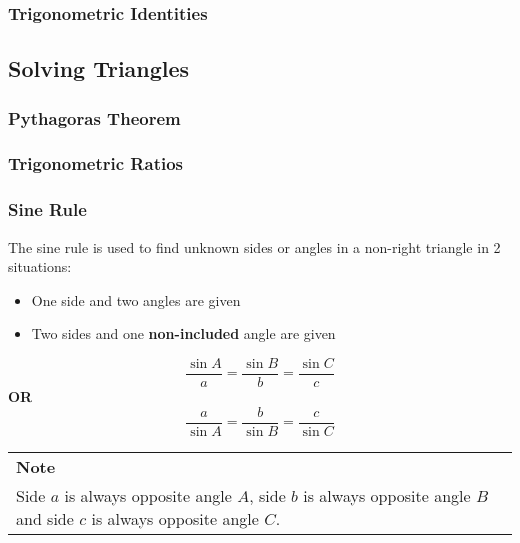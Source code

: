 \documentclass[a4paper]{article}
\newenvironment{Note}{
	\bgroup
	\def\arraystretch{1.5}
	\begin{NiceTabularX}{\textwidth}{X}
		\CodeBefore
		\columncolor{red!15}{1}
		\Body
		\textbf{Note} \\
}{
	\end{NiceTabularX}
	\egroup\mbox{}\\
}{}
\begin{document}
			\subsubsection{Trigonometric Identities}
		\subsection{Solving Triangles}
			\subsubsection{Pythagoras Theorem}
			\subsubsection{Trigonometric Ratios}
			\subsubsection{Sine Rule}
				The sine rule is used to find unknown sides or angles in a non-right triangle in 2 situations:
				\begin{itemize}
					\item One side and two angles are given
					\item Two sides and one \textbf{non-included} angle are given
				\end{itemize}
				\begin{minipage}{0.5\textwidth}
				\end{minipage}
				\hfill
				\begin{minipage}{0.5\textwidth}
					\centering
						\[
						\frac{\sin A}{a}=\frac{\sin B}{b}=\frac{\sin C}{c}
						\]
						\textbf{OR}
						\[
						\frac{a}{\sin A}=\frac{b}{\sin B}=\frac{c}{\sin C}
						\]
				\end{minipage}
				\begin{Note}
					Side $a$ is always opposite angle $A$, side $b$ is always opposite angle $B$ and side $c$ is always opposite angle $C$.
				\end{Note}
\end{document}
